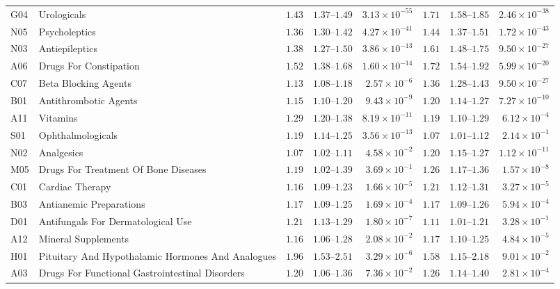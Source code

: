 \begin{longtable}{llrrrrrr}
G04 & Urologicals & $1.43$ & $1.37$–$1.49$ & $3.13 \times 10^{-55}$ & $1.71$ & $1.58$–$1.85$ & $2.46 \times 10^{-38}$ \\ 
N05 & Psycholeptics & $1.36$ & $1.30$–$1.42$ & $4.27 \times 10^{-41}$ & $1.44$ & $1.37$–$1.51$ & $1.72 \times 10^{-43}$ \\ 
N03 & Antiepileptics & $1.38$ & $1.27$–$1.50$ & $3.86 \times 10^{-13}$ & $1.61$ & $1.48$–$1.75$ & $9.50 \times 10^{-27}$ \\ 
A06 & Drugs For Constipation & $1.52$ & $1.38$–$1.68$ & $1.60 \times 10^{-14}$ & $1.72$ & $1.54$–$1.92$ & $5.99 \times 10^{-20}$ \\ 
C07 & Beta Blocking Agents & $1.13$ & $1.08$–$1.18$ & $2.57 \times 10^{-6}$ & $1.36$ & $1.28$–$1.43$ & $9.50 \times 10^{-27}$ \\ 
B01 & Antithrombotic Agents & $1.15$ & $1.10$–$1.20$ & $9.43 \times 10^{-9}$ & $1.20$ & $1.14$–$1.27$ & $7.27 \times 10^{-10}$ \\ 
A11 & Vitamins & $1.29$ & $1.20$–$1.38$ & $8.19 \times 10^{-11}$ & $1.19$ & $1.10$–$1.29$ & $6.12 \times 10^{-4}$ \\ 
S01 & Ophthalmologicals & $1.19$ & $1.14$–$1.25$ & $3.56 \times 10^{-13}$ & $1.07$ & $1.01$–$1.12$ & $2.14 \times 10^{-1}$ \\ 
N02 & Analgesics & $1.07$ & $1.02$–$1.11$ & $4.58 \times 10^{-2}$ & $1.20$ & $1.15$–$1.27$ & $1.12 \times 10^{-11}$ \\ 
M05 & Drugs For Treatment Of Bone Diseases & $1.19$ & $1.02$–$1.39$ & $3.69 \times 10^{-1}$ & $1.26$ & $1.17$–$1.36$ & $1.57 \times 10^{-8}$ \\ 
C01 & Cardiac Therapy & $1.16$ & $1.09$–$1.23$ & $1.66 \times 10^{-5}$ & $1.21$ & $1.12$–$1.31$ & $3.27 \times 10^{-5}$ \\ 
B03 & Antianemic Preparations & $1.17$ & $1.09$–$1.25$ & $1.69 \times 10^{-4}$ & $1.17$ & $1.09$–$1.26$ & $5.94 \times 10^{-4}$ \\ 
D01 & Antifungals For Dermatological Use & $1.21$ & $1.13$–$1.29$ & $1.80 \times 10^{-7}$ & $1.11$ & $1.01$–$1.21$ & $3.28 \times 10^{-1}$ \\ 
A12 & Mineral Supplements & $1.16$ & $1.06$–$1.28$ & $2.08 \times 10^{-2}$ & $1.17$ & $1.10$–$1.25$ & $4.84 \times 10^{-5}$ \\ 
H01 & Pituitary And Hypothalamic Hormones And Analogues & $1.96$ & $1.53$–$2.51$ & $3.29 \times 10^{-6}$ & $1.58$ & $1.15$–$2.18$ & $9.01 \times 10^{-2}$ \\ 
A03 & Drugs For Functional Gastrointestinal Disorders & $1.20$ & $1.06$–$1.36$ & $7.36 \times 10^{-2}$ & $1.26$ & $1.14$–$1.40$ & $2.81 \times 10^{-4}$ \\ 

\end{longtable}
